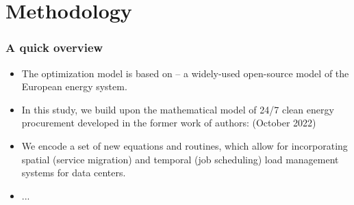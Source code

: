 
\section{Methodology}


\begin{frame}
  \frametitle{A quick overview}


{\small
  \begin{itemize}
    
    \item The optimization model is based on  -- a widely-used open-source model of the European energy system.

    \item In this study, we build upon the mathematical model of 24/7 clean energy procurement
    developed in the former work of authors:  (October 2022)
    
    \item We encode a set of new equations and routines, which allow for incorporating spatial (service migration) and temporal (job scheduling) load management systems for data centers.

    \item ... 

    
  \end{itemize}
}

\end{frame}


